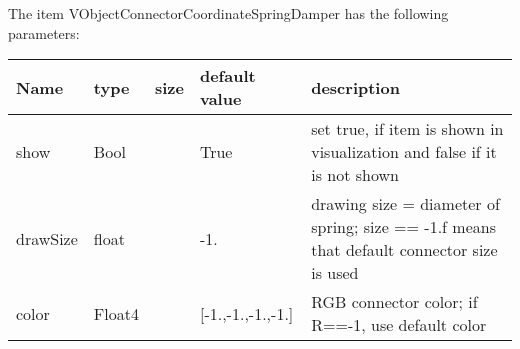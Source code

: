 The item VObjectConnectorCoordinateSpringDamper has the following parameters:
\begin{center}
  \footnotesize
  \begin{longtable}{| p{4.5cm} | p{2.5cm} | p{0.5cm} | p{2.5cm} | p{6cm} |}
    \hline
    \bf Name & \bf type & \bf size & \bf default value & \bf description \\ \hline
    show &     Bool &      &     True &     set true, if item is shown in visualization and false if it is not shown\\ \hline
    drawSize &     float &      &     -1. &     drawing size = diameter of spring; size == -1.f means that default connector size is used\\ \hline
    color &     Float4 &      &     [-1.,-1.,-1.,-1.] &     RGB connector color; if R==-1, use default color\\ \hline
	  \end{longtable}
	\end{center}

